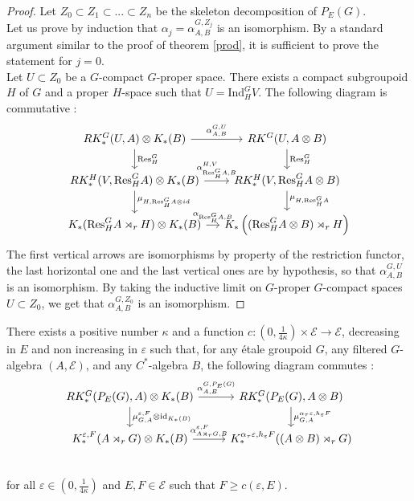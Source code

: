 \begin{proof}
Let $Z_0\subset Z_1\subset ... \subset Z_n $ be the skeleton decomposition of $P_E(G)$.\\

Let us prove by induction that $\alpha_j=\alpha^{G,Z_j}_{A,B}$ is an isomorphism. By a standard argument similar to the proof of theorem \ref{prod}, it is sufficient to prove the statement for $j=0$.\\

Let $U\subset Z_0$ be a $G$-compact $G$-proper space. There exists a compact subgroupoid $H$ of $G$ and a proper $H$-space such that $U = \text{Ind}_H^G V$. The following diagram is commutative :
\[\begin{tikzcd}[column sep = small] RK_*^G(U,A)\otimes K_*(B) \arrow{r}{\alpha_{A,B}^{G,U}} \arrow{d}{\text{Res}_H^G} & RK^G(U, A\otimes B) \arrow{d}{\text{Res}_H^G}\\
RK_*^H(V, \text{Res}_H^GA)\otimes K_*(B) \arrow{r}{\alpha_{\text{Res}_H^G A,B}^{H,V}} \arrow{d}{\mu_{H,\text{Res}_H^G A \otimes id}} & 
	RK_*^H(V, \text{Res}_H^G A\otimes B)\arrow{d}{\mu_{H,\text{Res}_H^G A }} \\
K_*(\text{Res}_H^G A\rtimes_r H)\otimes K_*(B)\arrow{r}{\alpha_{\text{Res}_H^G A,B}} & K_*\left((\text{Res}_H^G A\otimes B)\rtimes_r H\right) 
\end{tikzcd}\]
The first vertical arrows are isomorphisms by property of the restriction functor, the last horizontal one and the last vertical ones are by hypothesis, so that $\alpha_{A,B}^{G,U}$ is an isomorphism. By taking the inductive limit on $G$-proper $G$-compact spaces $U\subset Z_0$, we get that $\alpha_{A,B}^{G,Z_0}$ is an isomorphism.
\end{proof}

\begin{lem}\label{KunnethLemma}
There exists a positive number $\kappa$ and a function $c : (0,\frac{1}{4\kappa})\times\mathcal E\rightarrow \mathcal E$, decreasing in $E$ and non increasing in $\varepsilon$ such that, for any étale groupoid $G$, any filtered $G$-algebra $(A,\mathcal E)$, and any $C^*$-algebra $B$, the following diagram commutes :
\[\begin{tikzcd}
RK_*^G(P_E(G),A)\otimes K_*(B) \arrow{r}{\alpha^{G,P_E(G)}_{A,B}}\arrow{d}{\mu_{G,A}^{\varepsilon,F}\otimes \text{id}_{K_*(B)}} & 
RK_*^G(P_E(G),A\otimes B) \arrow{d}{\mu_{G,A}^{\alpha_ \tau\varepsilon,h_\varepsilon F}} \\
K_*^{\varepsilon,F}(A\rtimes_r G)\otimes K_*(B) \arrow{r}{\alpha_{A\rtimes_r G,B}^{\varepsilon,F}} & 
K_*^{\alpha_\tau\varepsilon,h_{\varepsilon}F}((A\otimes B)\rtimes_r G)\\
\end{tikzcd}\] 
for all $\varepsilon\in(0,\frac{1}{4\kappa})$ and $E,F\in\mathcal E$ such that $F\geq c(\varepsilon,E)$. 
\end{lem}

